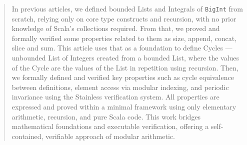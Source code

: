 \begin{abstract}
In previous articles, we defined bounded Lists and Integrals of
\texttt{BigInt} from scratch, relying only on core type constructs and
recursion, with no prior knowledge of Scala's collections required. From that,
we proved and formally verified some properties related to them as size,
append, concat, slice and sum. This article uses that as a foundation to define
Cycles --- unbounded List of Integers created from a bounded List, where the
values of the Cycle are the values of the List in repetition using recursion.
Then, we formally defined and verified key properties such as cycle equivalence
between definitions, element access via modular indexing, and periodic
invariance using the Stainless verification system. All properties are
expressed and proved within a minimal framework using only elementary
arithmetic, recursion, and pure Scala code. This work bridges mathematical
foundations and executable verification, offering a self-contained, verifiable
approach of modular arithmetic.
\end{abstract}
